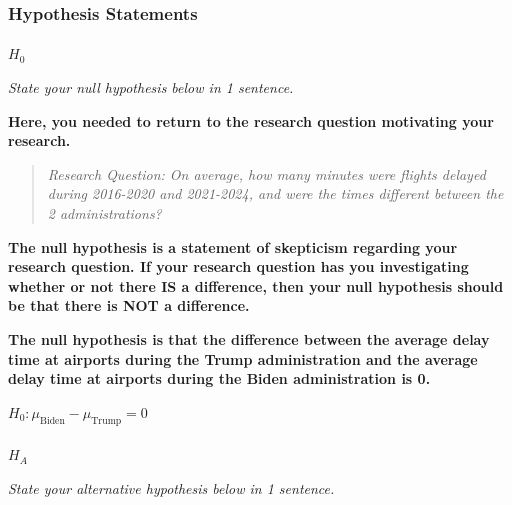 \documentclass[
  letterpaper,
  DIV=11,
  numbers=noendperiod]{scrartcl}
\makeatletter
\let\oldparagraph\paragraph
\renewcommand{\paragraph}{
    \@ifstar
      \xxxParagraphStar
      \xxxParagraphNoStar
  }
\newcommand{\xxxParagraphStar}[1]{\oldparagraph*{#1}\mbox{}}
\newcommand{\xxxParagraphNoStar}[1]{\oldparagraph{#1}\mbox{}}
\makeatother
\begin{document}
\subsubsection{Hypothesis Statements}\label{hypothesis-statements-1}

\paragraph{\texorpdfstring{\(H_0\)}{H\_0}}\label{h_0-1}

\emph{State your null hypothesis below in 1 sentence.}

\begin{tcolorbox}[enhanced jigsaw, toprule=.15mm, breakable, leftrule=.75mm, bottomrule=.15mm, rightrule=.15mm, colback=white, opacityback=0, colframe=quarto-callout-warning-color-frame, left=2mm, arc=.35mm]

\textbf{Here, you needed to return to the research question motivating
your research.}

\begin{quote}
\emph{Research Question: On average, how many minutes were flights
delayed during 2016-2020 and 2021-2024, and were the times different
between the 2 administrations?}
\end{quote}

\textbf{The null hypothesis is a statement of skepticism regarding your
research question. If your research question has you investigating
whether or not there IS a difference, then your null hypothesis should
be that there is NOT a difference.}

\textbf{The null hypothesis is that the difference between the average
delay time at airports during the Trump administration and the average
delay time at airports during the Biden administration is 0.}

\(H_0 \colon \mu_{\text{Biden}}-\mu_{\text{Trump}}=0\)

\end{tcolorbox}

\paragraph{\texorpdfstring{\(H_A\)}{H\_A}}\label{h_a-1}

\emph{State your alternative hypothesis below in 1 sentence.}
\end{document}
